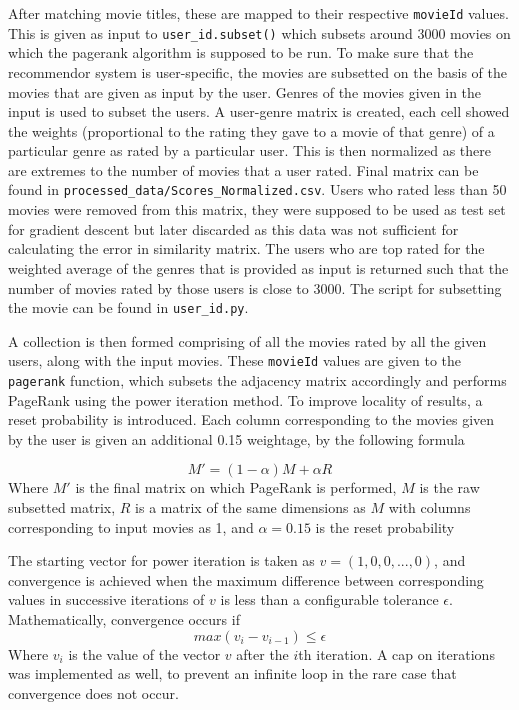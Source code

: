 \documentclass[11pt]{article}
\begin{document}
After matching movie titles, these are mapped to their respective
\texttt{movieId} values. This is given as input to
\texttt{user\_id.subset()} which subsets around 3000 movies on which the
pagerank algorithm is supposed to be run. To make sure that the
recommendor system is user-specific, the movies are subsetted on the
basis of the movies that are given as input by the user. Genres of the
movies given in the input is used to subset the users. A user-genre
matrix is created, each cell showed the weights (proportional to the
rating they gave to a movie of that genre) of a particular genre as
rated by a particular user. This is then normalized as there are
extremes to the number of movies that a user rated. Final matrix can be
found in \texttt{processed\_data/Scores\_Normalized.csv}. Users who
rated less than 50 movies were removed from this matrix, they were
supposed to be used as test set for gradient descent but later discarded
as this data was not sufficient for calculating the error in similarity
matrix. The users who are top rated for the weighted average of the
genres that is provided as input is returned such that the number of
movies rated by those users is close to 3000. The script for subsetting
the movie can be found in \texttt{user\_id.py}.

A collection is then formed comprising of all the movies rated by all
the given users, along with the input movies. These \texttt{movieId}
values are given to the \texttt{pagerank} function, which subsets the
adjacency matrix accordingly and performs PageRank using the power
iteration method. To improve locality of results, a reset probability is
introduced. Each column corresponding to the movies given by the user is
given an additional 0.15 weightage, by the following formula

\[ M' = (1-\alpha)M+\alpha R \] Where \(M'\) is the final matrix on
which PageRank is performed, \(M\) is the raw subsetted matrix, \(R\) is
a matrix of the same dimensions as \(M\) with columns corresponding to
input movies as 1, and \(\alpha=0.15\) is the reset probability

The starting vector for power iteration is taken as
\(v=(1, 0, 0, ..., 0)\), and convergence is achieved when the maximum
difference between corresponding values in successive iterations of
\(v\) is less than a configurable tolerance \(\epsilon\).
Mathematically, convergence occurs if
\[ max(v_i-v_{i-1}) \leq \epsilon \] Where \(v_i\) is the value of the
vector \(v\) after the \(i\)th iteration. A cap on iterations was
implemented as well, to prevent an infinite loop in the rare case that
convergence does not occur.
\end{document}
